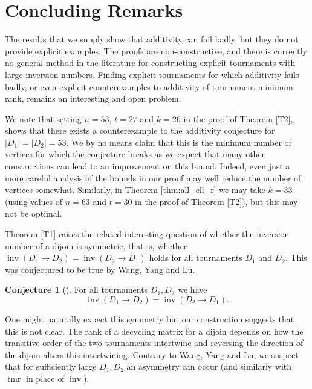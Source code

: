 \documentclass[a4paper, 12pt, reqno]{amsart}
\numberwithin{equation}{section}
\theoremstyle{plain}
\theoremstyle{remark}
\theoremstyle{definition}
\newtheorem{conj}[thm]{Conjecture}
\newcommand{\tmr}{\operatorname{tmr}}
\newcommand{\inv}{\operatorname{inv}}
\begin{document}
 \section{Concluding Remarks}\label{sec:conclusion}

 The results that we supply show that additivity can fail badly, but they do not provide explicit examples. The proofs are non-constructive, and there is currently no general method in the literature for constructing explicit tournaments with large inversion numbers. Finding explicit tournaments for which additivity fails badly, or even explicit counterexamples to additivity of tournament minimum rank, remains an interesting and open problem.
 
 We note that setting $n = 53$, $t=27$ and $k =26$ in the proof of Theorem \ref{T2}, shows that there exists a counterexample to the additivity conjecture for $|D_1|=|D_2|=53$. We by no means claim that this is the minimum number of vertices for which the conjecture breaks as we expect that many other constructions can lead to an improvement on this bound. Indeed, even just a more careful analysis of the bounds in our proof may well reduce the number of vertices somewhat.
Similarly, in Theorem \ref{thm:all_ell_r} we may take $k = 33$ (using values of $n=63$ and $t=30$ in the proof of Theorem \ref{T2}), but this may not be optimal.

 \bigskip


 Theorem \ref{T1} raises the related interesting question of whether the inversion number of a dijoin is symmetric, that is, whether $\inv(D_1 \to D_2) = \inv(D_2 \to D_1)$ holds for all tournaments $D_1$ and $D_2$. This was conjectured to be true by Wang, Yang and Lu. 
 
   \begin{conj}[{\cite[Conjecture 1.11]{Wang}}]\label{conj}
    For all tournaments $D_1,D_2$ we have
     \begin{equation*}
         \inv(D_1 \to D_2) = \inv(D_2 \to D_1).
     \end{equation*}
 \end{conj}
 
 One might naturally expect this symmetry but our construction suggests that this is not clear. The rank of a decycling matrix for a dijoin depends on how the transitive order of the two tournaments intertwine and reversing the direction of the dijoin alters this intertwining.
 Contrary to Wang, Yang and Lu, we suspect that for sufficiently large  $D_1,D_2$ an asymmetry can occur 
 (and similarly with $\tmr$ in place of $\inv$).
 
\end{document}
